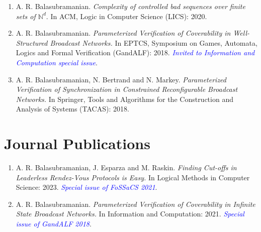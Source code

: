 \documentclass[11pt,a4paper,sans]{moderncv}        %
\begin{document}
\begin{enumerate}
	\item A. R. Balasubramanian. \textit{Complexity of controlled bad sequences over finite sets of $\mathbb{N}^d$}. In ACM, Logic in Computer Science (LICS): 2020.
	\item A. R. Balasubramanian. \textit{Parameterized Verification of Coverability in Well-Structured Broadcast Networks.} In EPTCS, 
	Symposium on Games, Automata, Logics and Formal Verification (GandALF): 2018. 
	\textit{\textcolor{blue}{Invited to Information and Computation special issue}}.
	\item A. R. Balasubramanian, N. Bertrand and N. Markey. \textit{Parameterized Verification of Synchronization in Constrained Reconfigurable Broadcast Networks.} In Springer, Tools and Algorithms for the Construction and Analysis of Systems (TACAS): 2018.
\end{enumerate}



\vspace{2pt}

\section{Journal Publications}
\begin{enumerate}
	\setlength\itemsep{2pt}
	\item A. R. Balasubramanian, J. Esparza and M. Raskin. \textit{Finding Cut-offs in Leaderless Rendez-Vous Protocols is Easy.} In Logical Methods in Computer Science: 2023. \textit{\textcolor{blue}{Special issue of FoSSaCS 2021}}.
	\item A. R. Balasubramanian. \textit{Parameterized Verification of Coverability in Infinite State Broadcast Networks.} In Information and Computation: 2021. \textit{\textcolor{blue}{Special issue of GandALF 2018}}.
\end{enumerate}

\vspace{2pt}
\end{document}
